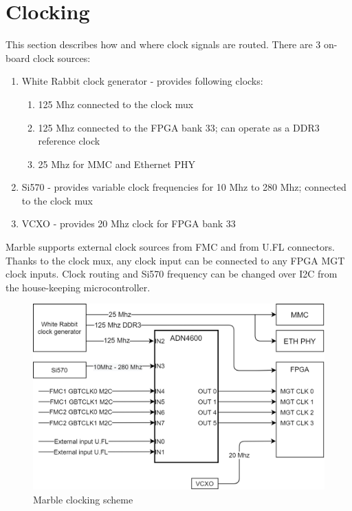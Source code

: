 \documentclass[12pt,oneside,a4]{article}
\begin{document}
\section{Clocking}
This section describes how and where clock signals are routed. There are 3 on-board clock sources:
\begin{enumerate}
	\item White Rabbit clock generator - provides following clocks:
		\begin{enumerate}
			\item 125 Mhz connected to the clock mux
			\item 125 Mhz connected to the FPGA bank 33; can operate as a DDR3 reference clock
			\item 25 Mhz for MMC and Ethernet PHY
		\end{enumerate}
	\item Si570 - provides variable clock frequencies for 10 Mhz to 280 Mhz; connected to the clock mux
	\item VCXO - provides 20 Mhz clock for FPGA bank 33
\end{enumerate}
Marble supports external clock sources from FMC and from U.FL connectors. Thanks to the clock mux, any clock input can be connected to any FPGA MGT clock inputs. Clock routing and Si570 frequency can be changed over I2C from the house-keeping microcontroller. 

\begin{figure}[H]
\begin{center}
\includegraphics[width=1\linewidth]{clocking.png}
 \caption{Marble clocking scheme}\label{clocking}
\end{center}
\end{figure}
\end{document}
